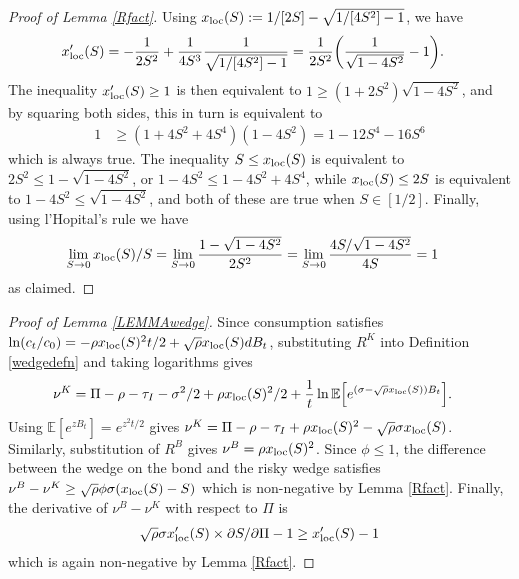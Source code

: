 \documentclass[11pt]{article}
\theoremstyle{plain}
\theoremstyle{definition} %
\begin{document}
\begin{proof}[Proof of Lemma \ref{Rfact}] %
Using $x_{\textnormal{loc}}(S) := 1/[2S] - \sqrt{1/[4S^2] - 1}$, we have 
\begin{align*} 
x_{\textnormal{loc}}'(S) & = -\frac{1}{2S^2} + \frac{1}{4S^3} \frac{1}{\sqrt{1/[4S^2] - 1}}
 = \frac{1}{2S^2} {\left( \frac{1}{\sqrt{1 - 4S^2}} - 1 \right)}.
\end{align*}
The inequality $x_{\textnormal{loc}}'(S) \geq 1$ is then equivalent to $1 \geq (1 + 2S^2)\sqrt{1 - 4S^2}$, and by squaring both sides, this in turn is equivalent to 
\begin{align*} 
1 & \geq (1 + 4S^2 + 4S^4)(1 - 4S^2) %
 = 1 - 12S^4 - 16S^6 
\end{align*}
which is always true. The inequality $S \leq x_{\textnormal{loc}}(S)$ is equivalent to $2S^2 \leq 1 - \sqrt{1 - 4S^2}$, or $1 - 4S^2 \leq 1 - 4S^2 + 4S^4$, while $x_{\textnormal{loc}}(S) \leq 2S$ is equivalent to $1 - 4S^2 \leq \sqrt{1 - 4S^2}$, and both of these are true when $S \in [1/2]$. Finally, using l'Hopital's rule we have 
\begin{align*}
\lim_{S \rightarrow 0} x_{\textnormal{loc}}(S)/S & = \lim_{S \rightarrow 0} \frac{1 - \sqrt{1 - 4S^2}}{2S^2}
 = \lim_{S \rightarrow 0} \frac{4S/\sqrt{1 - 4S^2}}{4S} = 1
\end{align*}
as claimed. 
\end{proof}

\begin{proof}[Proof of Lemma \ref{LEMMAwedge}]
Since consumption satisfies $\ln(c_t/c_0) = -\rho x_{\textnormal{loc}}(S)^2t/2 + \sqrt{\rho} x_{\textnormal{loc}}(S) dB_t$, substituting $R^K$ into Definition \ref{wedgedefn} and taking logarithms gives
\begin{align*}
\nu^K & = \Pi - \rho - \tau_I - \sigma^2/2 + \rho x_{\textnormal{loc}}(S)^2/2 + \frac{1}{t}\ln \mathbb{E}{\left[ e^{(\sigma - \sqrt{\rho} x_{\textnormal{loc}}(S))B_t}\right]}.
\end{align*}
Using $\mathbb{E}[e^{zB_t}] = e^{z^2t/2}$ gives $\nu^K=\Pi-\rho-\tau_I+\rho x_{\textnormal{loc}}(S)^2 - \sqrt{\rho} \sigma x_{\textnormal{loc}}(S)$. Similarly, substitution of $R^B$ gives $\nu^B = \rho x_{\textnormal{loc}}(S)^2$. Since $\phi \leq 1$, the difference between the wedge on the bond and the risky wedge satisfies $\nu^B - \nu^K \geq \sqrt{\rho} \phi \sigma {\left(x_{\textnormal{loc}}(S) - S\right)}$ which is non-negative by Lemma \ref{Rfact}. Finally, the derivative of $\nu^B - \nu^K$ with respect to $\Pi$ is 
\begin{align*}
\sqrt{\rho} \sigma x_{\textnormal{loc}}'(S) \times \partial S/\partial \Pi - 1 \geq x_{\textnormal{loc}}'(S) - 1
\end{align*}
which is again non-negative by Lemma \ref{Rfact}.
\end{proof}
\end{document}
